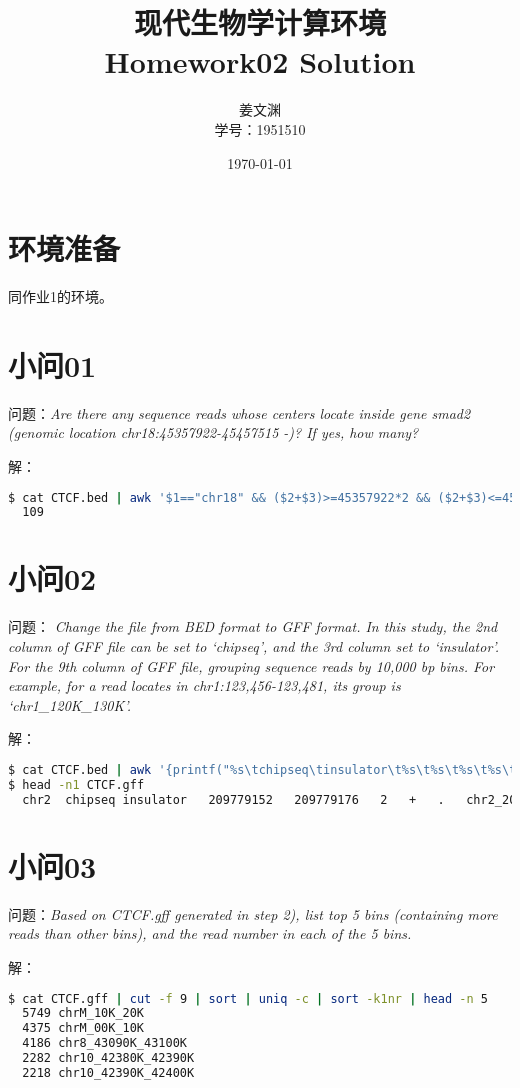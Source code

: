 \documentclass[cn,black,11pt,normal]{elegantnote}
\title{现代生物学计算环境\\Homework02 Solution}
\author{姜文渊\\学号：1951510}
\institute{School of Life Science, Tongji University}
\date{\today}
\begin{document}
\maketitle

\section{环境准备}
同作业1的环境。

\section{小问01}
问题：\textit{Are there any sequence reads whose centers locate inside gene smad2
(genomic location chr18:45357922-45457515 -)? If yes, how many?}


解：
\begin{lstlisting}[language=bash]
$ cat CTCF.bed | awk '$1=="chr18" && ($2+$3)>=45357922*2 && ($2+$3)<=45457515*2' | wc -l
  109
\end{lstlisting}

\section{小问02}
问题：\textit{ Change the file from BED format to GFF format. In this study, the 2nd column of GFF file can be set to ‘chipseq’, and the 3rd column set to ‘insulator’. 
For the 9th column of GFF file, grouping sequence reads by 10,000 bp bins. For example, for a read locates in chr1:123,456-123,481, its group is ‘chr1\_120K\_130K’.}


解：
\begin{lstlisting}[language=bash]
$ cat CTCF.bed | awk '{printf("%s\tchipseq\tinsulator\t%s\t%s\t%s\t%s\t.\t%s_%d0K_%d0K\n",$1,$2,$3,$5,$6,$1,$2/10000,($3-1)/10000+1)}' > CTCF.gff 
$ head -n1 CTCF.gff 
  chr2	chipseq	insulator	209779152	209779176	2	+	.	chr2_209770K_209780K
\end{lstlisting}

\section{小问03}
问题：\textit{Based on CTCF.gff generated in step 2), list top 5 bins (containing more reads than other bins), and the read number in each of the 5 bins.}


解：
\begin{lstlisting}[language=bash]
$ cat CTCF.gff | cut -f 9 | sort | uniq -c | sort -k1nr | head -n 5
  5749 chrM_10K_20K
  4375 chrM_00K_10K
  4186 chr8_43090K_43100K
  2282 chr10_42380K_42390K
  2218 chr10_42390K_42400K
\end{lstlisting}
\end{document}
